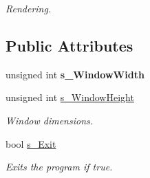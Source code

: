 \begin{DoxyCompactItemize}
\begin{DoxyCompactList}\small\item\em Rendering. \item\end{DoxyCompactList}\end{DoxyCompactItemize}
\subsection*{Public Attributes}
\begin{DoxyCompactItemize}
\item 
\hypertarget{struct_t_i_l_f_w_a7e0f56253be2c06d198f1b8b78eee6b7}{
unsigned int {\bfseries s\_\-WindowWidth}}
\label{struct_t_i_l_f_w_a7e0f56253be2c06d198f1b8b78eee6b7}

\item 
\hypertarget{struct_t_i_l_f_w_a5d9e1e3ded6c65a1848c63dd58c30ffd}{
unsigned int \hyperlink{struct_t_i_l_f_w_a5d9e1e3ded6c65a1848c63dd58c30ffd}{s\_\-WindowHeight}}
\label{struct_t_i_l_f_w_a5d9e1e3ded6c65a1848c63dd58c30ffd}

\begin{DoxyCompactList}\small\item\em Window dimensions. \item\end{DoxyCompactList}\item 
\hypertarget{struct_t_i_l_f_w_a40d4d6b79ac9b583b2b36bbf379f7348}{
bool \hyperlink{struct_t_i_l_f_w_a40d4d6b79ac9b583b2b36bbf379f7348}{s\_\-Exit}}
\label{struct_t_i_l_f_w_a40d4d6b79ac9b583b2b36bbf379f7348}

\begin{DoxyCompactList}\small\item\em Exits the program if true. \item\end{DoxyCompactList}\end{DoxyCompactItemize}
